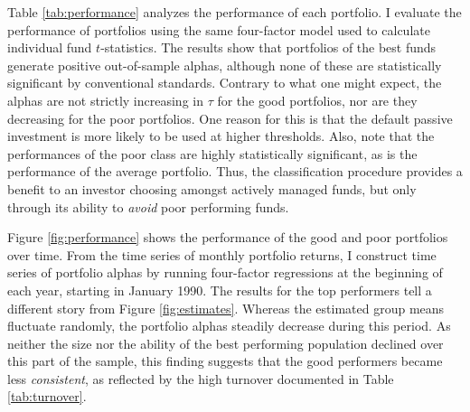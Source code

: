 		Table \ref{tab:performance} analyzes the performance of each portfolio. I evaluate the performance of portfolios using the same four-factor model used to calculate individual fund $t$-statistics. The results show that portfolios of the best funds generate positive out-of-sample alphas, although none of these are statistically significant by conventional standards. Contrary to what one might expect, the alphas are not strictly increasing in $\tau$ for the good portfolios, nor are they decreasing for the poor portfolios. One reason for this is that the default passive investment is more likely to be used at higher thresholds. Also, note that the performances of the poor class are highly statistically significant, as is the performance of the average portfolio.  Thus, the classification procedure provides a benefit to an investor choosing amongst actively managed funds, but only through its ability to \textit{avoid} poor performing funds.

		Figure \ref{fig:performance} shows the performance of the good and poor portfolios over time. From the time series of monthly portfolio returns, I construct time series of portfolio alphas by running four-factor regressions at the beginning of each year, starting in January 1990. The results for the top performers tell a different story from Figure \ref{fig:estimates}. Whereas the estimated group means fluctuate randomly, the portfolio alphas steadily decrease during this period. As neither the size nor the ability of the best performing population declined over this part of the sample, this finding suggests that the good performers became less \textit{consistent}, as reflected by the high turnover documented in Table \ref{tab:turnover}.

